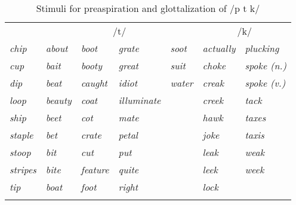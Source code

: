 \documentclass[output=paper,colorlinks,citecolor=brown]{langscibook}
\begin{document}
\begin{table}
\caption{Stimuli for preaspiration and glottalization of /p t k/}
\label{ex:clayton:stimuli-preaspiration}
\begin{tabular}{l llll ll}
\lsptoprule
\multicolumn{1}{c}{/p/}              &  \multicolumn{4}{c}{/t/}               &  \multicolumn{2}{c}{/k/}\\
\cmidrule(lr){1-1}\cmidrule(lr){2-5}\cmidrule(lr){6-7}
\itshape chip   & \itshape about   & \itshape boot     & \itshape grate      & \itshape soot  & \itshape actually  & \itshape plucking  \\
\itshape cup     & \itshape bait    & \itshape booty    & \itshape great      & \itshape suit  & \itshape choke     & \itshape spoke (n.)\\
\itshape dip     & \itshape beat    & \itshape caught   & \itshape idiot      & \itshape water & \itshape creak     & \itshape spoke (v.)\\
\itshape loop    & \itshape beauty  & \itshape coat     & \itshape illuminate &                & \itshape creek     & \itshape tack      \\
\itshape ship    & \itshape beet    & \itshape cot      & \itshape mate       &                & \itshape hawk      & \itshape taxes     \\
\itshape staple  & \itshape bet     & \itshape crate    & \itshape petal      &                & \itshape joke      & \itshape taxis     \\
\itshape stoop   & \itshape bit     & \itshape cut      & \itshape put        &                & \itshape leak      & \itshape weak      \\
\itshape stripes & \itshape bite    & \itshape feature  & \itshape quite      &                & \itshape leek      & \itshape week      \\
\itshape tip     & \itshape boat    & \itshape foot     & \itshape right      &                & \itshape lock      & \\
\lspbottomrule
\end{tabular}
\end{table}
\end{document}
